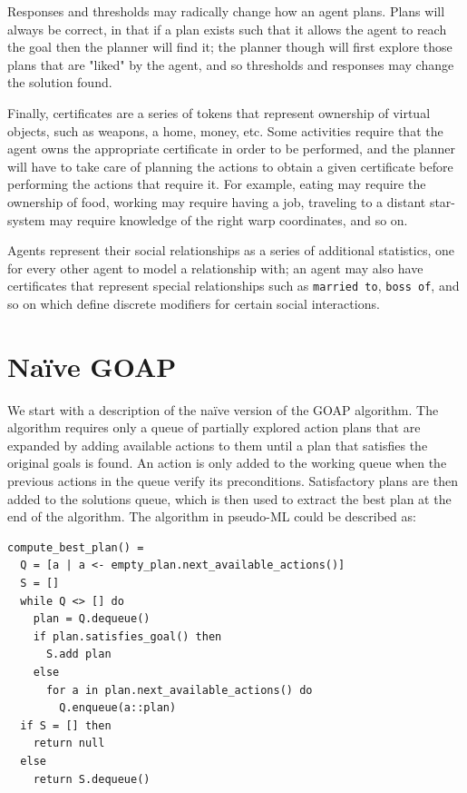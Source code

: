 Responses and thresholds may radically change how an agent plans. Plans will always be correct, in that if a plan exists such that it allows the agent to reach the goal then the planner will find it; the planner though will first explore those plans that are "liked" by the agent, and so thresholds and responses may change the solution found.

Finally, certificates are a series of tokens that represent ownership of virtual objects, such as weapons, a home, money, etc. Some activities require that the agent owns the appropriate certificate in order to be performed, and the planner will have to take care of planning the actions to obtain a given certificate before performing the actions that require it. For example, eating may require the ownership of food, working may require having a job, traveling to a distant star-system may require knowledge of the right warp coordinates, and so on.

Agents represent their social relationships as a series of additional statistics, one for every other agent to model a relationship with; an agent may also have certificates that represent special relationships such as \texttt{married to}, \texttt{boss of}, and so on which define discrete modifiers for certain social interactions.


\section{Naïve GOAP}
\label{sec:naive_goap}

We start with a description of the naïve version of the GOAP algorithm. The algorithm requires only a queue of partially explored action plans that are expanded by adding available actions to them until a plan that satisfies the original goals is found. An action is only added to the working queue when the previous actions in the queue verify its preconditions. Satisfactory plans are then added to the solutions queue, which is then used to extract the best plan at the end of the algorithm. The algorithm in pseudo-ML could be described as:

\begin{lstlisting}
compute_best_plan() =
  Q = [a | a <- empty_plan.next_available_actions()]
  S = []
  while Q <> [] do
    plan = Q.dequeue()
    if plan.satisfies_goal() then
      S.add plan
    else
      for a in plan.next_available_actions() do
        Q.enqueue(a::plan)
  if S = [] then
    return null
  else
    return S.dequeue()
\end{lstlisting}

